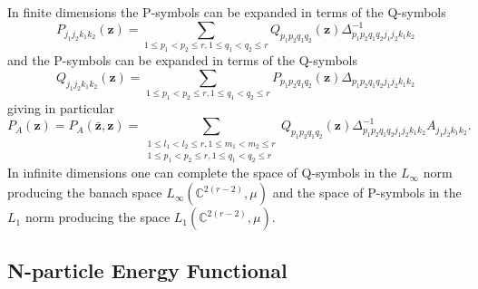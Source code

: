 \documentclass[aps,preprint]{revtex4}%
\begin{document}
In finite dimensions the P-symbols can be expanded in terms of the Q-symbols
\begin{equation}
P_{j_{1}j_{2}k_{1}k_{2}}\left(  \mathbf{z}\right)  =\sum_{1\leq p_{1}%
<p_{2}\leq r,1\leq q_{1}<q_{2}\leq r}Q_{p_{1}p_{2}q_{1}q_{2}}\left(
\mathbf{z}\right)  \Delta_{p_{1}p_{2}q_{1}q_{2}j_{1}j_{2}k_{1}k_{2}}^{-1}
\label{P in Q}%
\end{equation}
and the P-symbols can be expanded in terms of the Q-symbols%
\begin{equation}
Q_{j_{1}j_{2}k_{1}k_{2}}\left(  \mathbf{z}\right)  =\sum_{1\leq p_{1}%
<p_{2}\leq r,1\leq q_{1}<q_{2}\leq r}P_{p_{1}p_{2}q_{1}q_{2}}\left(
\mathbf{z}\right)  \Delta_{p_{1}p_{2}q_{1}q_{2}j_{1}j_{2}k_{1}k_{2}}
\label{Q in P}%
\end{equation}
giving in particular%
\begin{equation}
P_{A}\left(  \mathbf{z}\right)  =P_{A}\left(  \mathbf{\bar{z},z}\right)
=\sum_{\substack{1\leq l_{1}<l_{2}\leq r,1\leq m_{1}<m_{2}\leq r\\1\leq
p_{1}<p_{2}\leq r,1\leq q_{1}<q_{2}\leq r}}Q_{p_{1}p_{2}q_{1}q_{2}}\left(
\mathbf{z}\right)  \Delta_{p_{1}p_{2}q_{1}q_{2}j_{1}j_{2}k_{1}k_{2}}%
^{-1}A_{j_{1}j_{2}k_{1}k_{2}}.
\end{equation}
In infinite dimensions one can complete the space of Q-symbols in the
$L_{\infty}$ norm producing the banach space $L_{\infty}\left(  \mathbb{C}%
^{2\left(  r-2\right)  },\mu\right)  $ and the space of P-symbols in the
$L_{1}$ norm producing the space $L_{1}\left(  \mathbb{C}^{2\left(
r-2\right)  },\mu\right)  .$

\subsection{N-particle Energy Functional}
\end{document}
